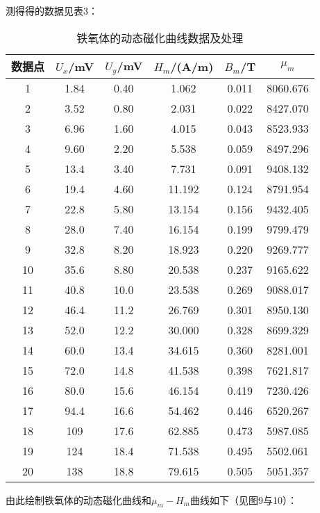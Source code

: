 \documentclass[11pt]{article}
\begin{document}
测得得的数据见表3：
\begin{table}[!ht]
    \centering
    \begin{tabular}{c|cc|ccc}
        \toprule
        数据点 & $U_x$/mV & $U_y$/mV & $H_m$/(A/m) & $B_m$/T & $\mu_m$ \\ \midrule
        1 & 1.84 & 0.40 & 1.062  & 0.011  & 8060.676  \\ 
        2 & 3.52 & 0.80 & 2.031  & 0.022  & 8427.070  \\ 
        3 & 6.96 & 1.60 & 4.015  & 0.043  & 8523.933  \\ 
        4 & 9.60 & 2.20 & 5.538  & 0.059  & 8497.296  \\ 
        5 & 13.4 & 3.40 & 7.731  & 0.091  & 9408.132  \\ 
        6 & 19.4 & 4.60 & 11.192  & 0.124  & 8791.954  \\ 
        7 & 22.8 & 5.80 & 13.154  & 0.156  & 9432.405  \\ 
        8 & 28.0  & 7.40 & 16.154  & 0.199  & 9799.479  \\ 
        9 & 32.8 & 8.20 & 18.923  & 0.220  & 9269.777  \\ 
        10 & 35.6 & 8.80 & 20.538  & 0.237  & 9165.622  \\ 
        11 & 40.8 & 10.0 & 23.538  & 0.269  & 9088.017  \\ 
        12 & 46.4 & 11.2 & 26.769  & 0.301  & 8950.130  \\ 
        13 & 52.0 & 12.2 & 30.000  & 0.328  & 8699.329  \\ 
        14 & 60.0 & 13.4 & 34.615  & 0.360  & 8281.001  \\ 
        15 & 72.0 & 14.8 & 41.538  & 0.398  & 7621.817  \\ 
        16 & 80.0 & 15.6 & 46.154  & 0.419  & 7230.426  \\ 
        17 & 94.4 & 16.6 & 54.462  & 0.446  & 6520.267  \\ 
        18 & 109 & 17.6 & 62.885  & 0.473  & 5987.085  \\ 
        19 & 124 & 18.4 & 71.538  & 0.495  & 5502.061  \\ 
        20 & 138 & 18.8 & 79.615  & 0.505  & 5051.357 \\ 
        \bottomrule
    \end{tabular}
    \caption{铁氧体的动态磁化曲线数据及处理}
\end{table}

由此绘制铁氧体的动态磁化曲线和$\mu_m -H_m$曲线如下（见图9与10）：
\end{document}
